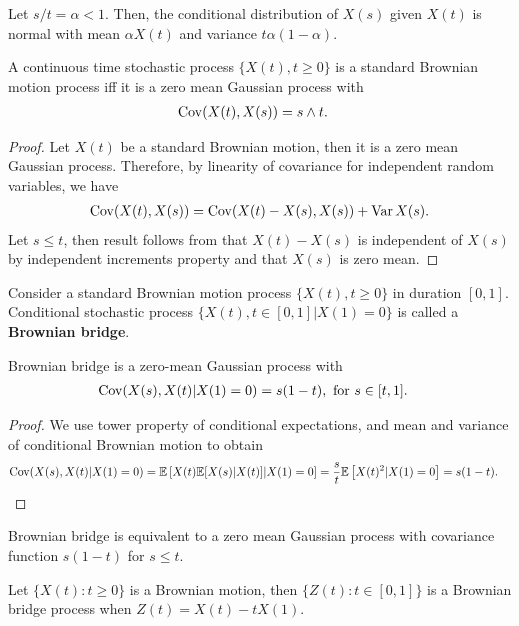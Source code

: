 \documentclass[a4paper,10pt,english]{article}
\begin{document}
\begin{cor} Let $s/t = \alpha < 1$. Then, the conditional distribution of $X(s)$ given $X(t)$ is normal with mean $\alpha X(t)$ and variance $t \alpha(1-\alpha)$.
\end{cor}
\begin{thm} A continuous time stochastic process $\{X(t), t \geqslant 0\}$ is a standard Brownian motion process iff it is a zero mean Gaussian process with 
\begin{align*}
\operatorname{Cov}(X(t), X(s)) &= s \wedge t.
\end{align*}
\end{thm}
\begin{proof} Let $X(t)$ be a standard Brownian motion, then it is a zero mean Gaussian process. 
Therefore, by linearity of covariance for independent random variables, we have
\begin{align*}
\operatorname{Cov}(X(t),X(s))  = \operatorname{Cov}(X(t)-X(s),X(s)) + \operatorname{Var} X(s).
\end{align*}
Let $s \leq t$, then result follows from that $X(t) - X(s)$ is independent of $X(s)$ by independent increments property and that $X(s)$ is zero mean. 
\end{proof}
\begin{defn} Consider a standard Brownian motion process $\{X(t), t \geqslant 0\}$ in duration $[0,1]$. Conditional stochastic process $\{X(t), t \in [0,1]| X(1) = 0\}$ is called a \textbf{Brownian bridge}.
\end{defn}
\begin{prop} Brownian bridge is a zero-mean Gaussian process with 
\begin{align*}
\operatorname{Cov}(X(s), X(t)|X(1) = 0) &= s(1- t),\text{ for } s \in [t, 1].
\end{align*}
\end{prop}
\begin{proof} We use tower property of conditional expectations, and mean and variance of conditional Brownian motion to obtain
\begin{align*}
\operatorname{Cov}(X(s), X(t)|X(1) = 0) & = \mathbb{E} \left[X(t) \mathbb{E}[X(s) | X(t)]| X(1) = 0\right] = \frac{s}{t} \mathbb{E} \left[X(t)^2| X(1) = 0\right] = s(1-t).
\end{align*}
\end{proof}
\begin{rem} Brownian bridge is equivalent to a zero mean Gaussian process with covariance function $s(1-t)$ for $s \leq t$.
\end{rem}
\begin{prop} Let $\{X(t): t \geqslant 0\}$ is a Brownian motion, then $\{Z(t) : t \in [0, 1]\}$ is a Brownian bridge process when $Z(t) = X(t) - tX(1)$.
\end{prop}
\end{document}
